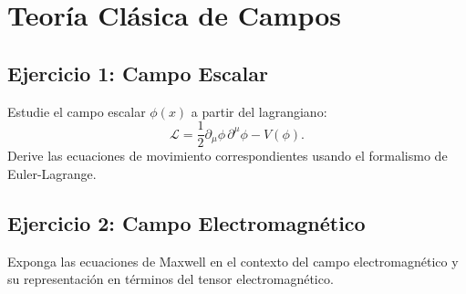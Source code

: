 \documentclass[12pt]{article}
\begin{document}
\section{Teoría Clásica de Campos}
\subsection{Ejercicio 1: Campo Escalar}
Estudie el campo escalar \(\phi(x)\) a partir del lagrangiano:
\[
\mathcal{L} = \frac{1}{2}\partial_\mu\phi\,\partial^\mu\phi - V(\phi).
\]
Derive las ecuaciones de movimiento correspondientes usando el formalismo de Euler-Lagrange.

\subsection{Ejercicio 2: Campo Electromagnético}
Exponga las ecuaciones de Maxwell en el contexto del campo electromagnético y su representación en términos del tensor electromagnético.
\end{document}
